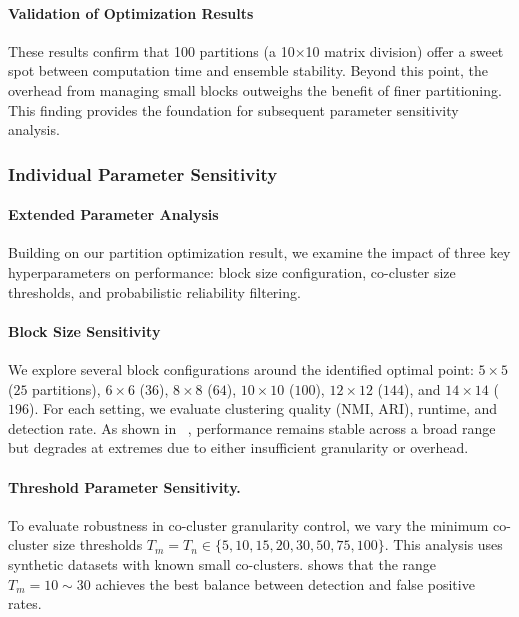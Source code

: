 \documentclass[journal]{IEEEtran}
\begin{document}
{        \paragraph{Validation of Optimization Results}
        These results confirm that 100 partitions (a 10×10 matrix division) offer a sweet spot between computation time and ensemble stability. Beyond this point, the overhead from managing small blocks outweighs the benefit of finer partitioning. This finding provides the foundation for subsequent parameter sensitivity analysis.

        \subsubsection{Individual Parameter Sensitivity}

        \paragraph{Extended Parameter Analysis}
        Building on our partition optimization result, we examine the impact of three key hyperparameters on performance: block size configuration, co-cluster size thresholds, and probabilistic reliability filtering.

        \paragraph{Block Size Sensitivity}
        We explore several block configurations around the identified optimal point: $5 \times 5$ ($25$ partitions), $6 \times 6$ ($36$), $8 \times 8$ ($64$), $10 \times 10$ ($100$), $12 \times 12$ ($144$), and $14 \times 14$ ($196$). For each setting, we evaluate clustering quality (NMI, ARI), runtime, and detection rate. As shown in ~, performance remains stable across a broad range but degrades at extremes due to either insufficient granularity or overhead.

        \paragraph{Threshold Parameter Sensitivity.}
        To evaluate robustness in co-cluster granularity control, we vary the minimum co-cluster size thresholds \( T_m = T_n \in \{5, 10, 15, 20, 30, 50, 75, 100\} \). This analysis uses synthetic datasets with known small co-clusters.  shows that the range \( T_m = 10 \sim 30 \) achieves the best balance between detection and false positive rates.

}
\end{document}
